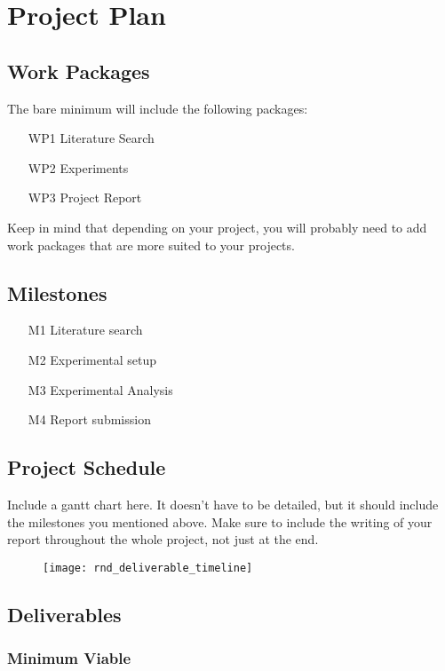 \documentclass[rnd]{mas_proposal}
\begin{document}
\chapter{Project Plan}

\section{Work Packages}
The bare minimum will include the following packages:
\begin{enumerate}
    \item[WP1] Literature Search
    \item[WP2] Experiments
    \item[WP3] Project Report
\end{enumerate}
Keep in mind that depending on your project, you will probably need to add work packages that are more suited to your projects.

\section{Milestones}
\begin{enumerate}
    \item[M1] Literature search
    \item[M2] Experimental setup
    \item[M3] Experimental Analysis
    \item[M4] Report submission
\end{enumerate}

\section{Project Schedule}
Include a gantt chart here. It doesn't have to be detailed, but it should include the milestones you mentioned above.
Make sure to include the writing of your report throughout the whole project, not just at the end.

\begin{figure}[h!]
    \texttt{[image: rnd\_deliverable\_timeline]}
    \caption{}
    \label{}
\end{figure}

\section{Deliverables}
\subsection{Minimum Viable}
\end{document}

